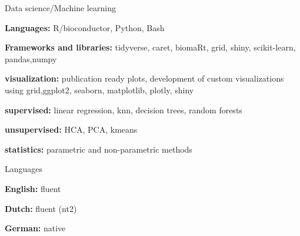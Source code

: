 \begin{cvskills}
      
  \cvskill
    {Data science/Machine learning}%
    {
      \begin{cvitems}
        \item {\textbf{Languages:} R/bioconductor, Python, Bash}
        \item{\textbf{Frameworks and libraries:} tidyverse, caret, biomaRt, grid, shiny, scikit-learn, pandas,\newline numpy}
        \item {\textbf{visualization:} publication ready plots, development of custom visualizations using grid,\newline ggplot2, seaborn, matplotlib, plotly, shiny}
        \item {\textbf{supervised:} linear regression, knn, decision trees, random forests}
        \item {\textbf{unsupervised:} HCA, PCA, kmeans}
        \item {\textbf{statistics:} parametric and non-parametric methods}
      \end{cvitems}
    }
  \cvskill
    {Languages} %
    {
      \begin{cvitems}
        \item {\textbf{English:} fluent}
        \item {\textbf{Dutch:} fluent (nt2)}
        \item {\textbf{German:} native}
      \end{cvitems}
    }
\end{cvskills}
